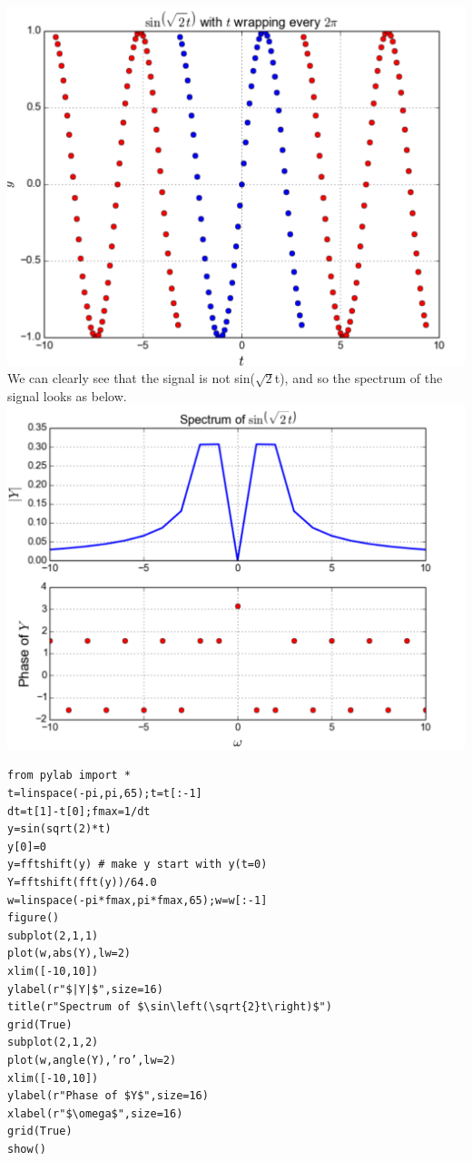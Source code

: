 \documentclass[10pt,english, openany]{book}
\begin{document}
{\centering \includegraphics[scale=0.3]{Figure1.png}}\\
We can clearly see that the signal is not sin($\sqrt{2}$t), and so the spectrum of the signal looks as below.\\
{\centering \includegraphics[scale=0.3]{Figure2.png}}\\
\begin{verbatim}
from pylab import * 
t=linspace(-pi,pi,65);t=t[:-1] 
dt=t[1]-t[0];fmax=1/dt
y=sin(sqrt(2)*t)
y[0]=0
y=fftshift(y) # make y start with y(t=0)
Y=fftshift(fft(y))/64.0 
w=linspace(-pi*fmax,pi*fmax,65);w=w[:-1]
figure()
subplot(2,1,1)
plot(w,abs(Y),lw=2)
xlim([-10,10])
ylabel(r"$|Y|$",size=16)
title(r"Spectrum of $\sin\left(\sqrt{2}t\right)$") 
grid(True)
subplot(2,1,2)
plot(w,angle(Y),’ro’,lw=2)
xlim([-10,10])
ylabel(r"Phase of $Y$",size=16)
xlabel(r"$\omega$",size=16)
grid(True)
show()
\end{verbatim}
\end{document}
